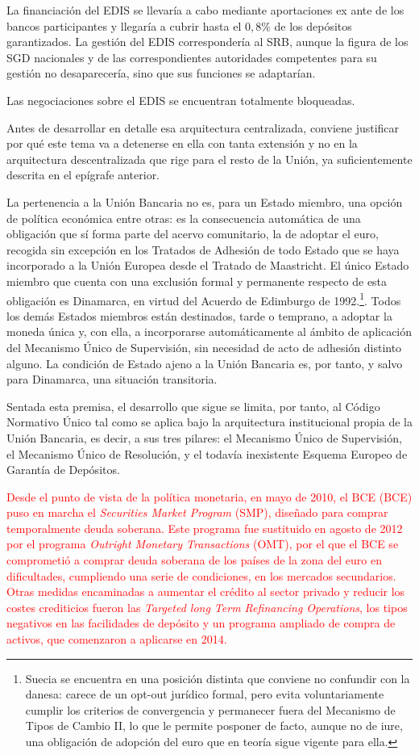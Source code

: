 \documentclass[10pt,a4paper]{article}
\begin{document}
{{    La financiación del EDIS se llevaría a cabo mediante aportaciones ex ante de los bancos participantes y llegaría a cubrir hasta el $0,8\%$ de los depósitos garantizados. La gestión del EDIS correspondería al SRB, aunque la figura de los SGD nacionales y de las correspondientes autoridades competentes para su gestión no desaparecería, sino que sus funciones se adaptarían. 
    
    Las negociaciones sobre el EDIS se encuentran totalmente bloqueadas.
}

Antes de desarrollar en detalle esa arquitectura centralizada, conviene justificar por qué este tema va a detenerse en ella con tanta extensión y no en la arquitectura descentralizada que rige para el resto de la Unión, ya suficientemente descrita en el epígrafe anterior.

La pertenencia a la Unión Bancaria no es, para un Estado miembro, una opción de política económica entre otras: es la consecuencia automática de una obligación que sí forma parte del acervo comunitario, la de adoptar el euro, recogida sin excepción en los Tratados de Adhesión de todo Estado que se haya incorporado a la Unión Europea desde el Tratado de Maastricht. El único Estado miembro que cuenta con una exclusión formal y permanente respecto de esta obligación es Dinamarca, en virtud del Acuerdo de Edimburgo de 1992.\footnote{%
    Suecia se encuentra en una posición distinta que conviene no confundir con la danesa: carece de un opt-out jurídico formal, pero evita voluntariamente cumplir los criterios de convergencia y permanecer fuera del Mecanismo de Tipos de Cambio II, lo que le permite posponer de facto, aunque no de iure, una obligación de adopción del euro que en teoría sigue vigente para ella.
}. Todos los demás Estados miembros están destinados, tarde o temprano, a adoptar la moneda única y, con ella, a incorporarse automáticamente al ámbito de aplicación del Mecanismo Único de Supervisión, sin necesidad de acto de adhesión distinto alguno. La condición de Estado ajeno a la Unión Bancaria es, por tanto, y salvo para Dinamarca, una situación transitoria.

Sentada esta premisa, el desarrollo que sigue se limita, por tanto, al Código Normativo Único tal como se aplica bajo la arquitectura institucional propia de la Unión Bancaria, es decir, a sus tres pilares: el Mecanismo Único de Supervisión, el Mecanismo Único de Resolución, y el todavía inexistente Esquema Europeo de Garantía de Depósitos.


\textcolor{red}{Desde el punto de vista de la política monetaria, en mayo de 2010, el BCE (BCE) puso en marcha el \textit{Securities Market Program} (SMP), diseñado para comprar temporalmente deuda soberana. Este programa fue sustituido en agosto de 2012 por el programa \textit{Outright Monetary Transactions} (OMT), por el que el BCE se comprometió a comprar deuda soberana de los países de la zona del euro en dificultades, cumpliendo una serie de condiciones, en los mercados secundarios. Otras medidas encaminadas a aumentar el crédito al sector privado y reducir los costes crediticios fueron las \textit{Targeted long Term Refinancing Operations}, los tipos negativos en las facilidades de depósito y un programa ampliado de compra de activos, que comenzaron a aplicarse en 2014.

}}
\end{document}
